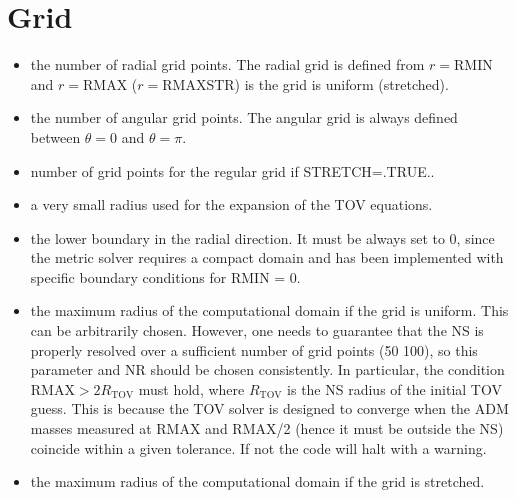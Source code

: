 \documentclass[letterpaper,10pt,english]{sphinxmanual}
\begin{document}
\section{Grid}
\label{\detokenize{user_params:grid}}\begin{itemize}
\item {} 
\sphinxAtStartPar
{} \sphinxhyphen{} the number of radial grid points. The radial grid is defined from \(r=\)RMIN and \(r=\)RMAX (\(r=\)RMAXSTR) is the grid is uniform (stretched).


\item {} 
\sphinxAtStartPar
{} \sphinxhyphen{} the number of angular grid points. The angular grid is always defined between \(\theta = 0\) and \(\theta = \pi\).


\item {} 
\sphinxAtStartPar
{} \sphinxhyphen{} number of grid points for the regular grid if STRETCH=.TRUE..


\item {} 
\sphinxAtStartPar
{} \sphinxhyphen{} a very small radius used for the expansion of the TOV equations.


\item {} 
\sphinxAtStartPar
{} \sphinxhyphen{} the lower boundary in the radial direction. It must be always set to 0, since the metric solver
requires a compact domain and has been implemented with specific boundary conditions for RMIN = 0.


\item {} 
\sphinxAtStartPar
{} \sphinxhyphen{} the maximum radius of the computational domain if the grid is uniform. This can be arbitrarily chosen. However,
one needs to guarantee that the NS is properly resolved over a sufficient number of grid points (50\sphinxhyphen{}
100), so this parameter and NR should be chosen consistently. In particular, the condition RMAX\( >
2R_\mathrm{TOV}\) must hold, where \(R_\mathrm{TOV}\) is the NS radius of the initial TOV guess. This is because the TOV
solver is designed to converge when the ADM masses measured at RMAX and RMAX/2 (hence it must
be outside the NS) coincide within a given tolerance. If not the code will halt with a warning.


\item {} 
\sphinxAtStartPar
{} \sphinxhyphen{} the maximum radius of the computational domain if the grid is stretched.



\end{itemize}
\end{document}
